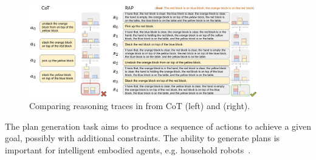 \begin{figure}
    \centering
    \includegraphics[width=0.9\textwidth]{sections/Figure-4_final.pdf}
    \vspace{-8pt}
    \caption{Comparing reasoning traces in \blocksworld from CoT (left) and \ours (right).}
    \label{fig:bw_example}
    \label{fig:my_label}
    \vspace{-12pt}
\end{figure}



The plan generation task aims to produce a sequence of actions to achieve a given goal, possibly with additional constraints. The ability to generate plans is important for intelligent embodied agents, e.g. household robots~\cite{puig2018virtualhome}. %


